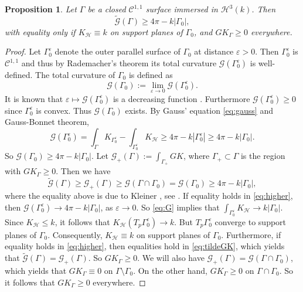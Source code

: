 \documentclass[11pt]{amsart}
\newtheorem{proposition}[theorem]{Proposition}
\theoremstyle{definition}
\newcommand{\C}{\mathcal{C}}
\renewcommand{\epsilon}{\varepsilon}
\renewcommand{\tilde}{\widetilde}
\begin{document}
\begin{proposition}\label{prop:high-g}
Let $\Gamma$ be a closed $\C^{1,1}$ surface immersed in $\mathcal{H}^3(k)$. Then
\begin{equation}\label{eq:higher}
\tilde{\mathcal{G}}(\Gamma)\geq 4\pi -k|\Gamma_0|,
\end{equation}
with equality only if $K_{\mathcal{H}}\equiv k$ on support planes of $\Gamma_0$, and $GK_\Gamma\geq 0$ everywhere.
\end{proposition}
\begin{proof}
Let $\Gamma_0^\epsilon$ denote the outer parallel surface of $\Gamma_0$ at distance $\epsilon>0$. Then $\Gamma_0^\epsilon$ is $\C^{1,1}$ \cite[Lem. 2.6]{ghomi-spruck2022} and thus by Rademacher's theorem its total curvature $\mathcal{G}(\Gamma_0^\epsilon)$ is well-defined. The total curvature of $\Gamma_0$ is defined as
$$
\mathcal{G}(\Gamma_0)
:=
\lim_{\epsilon\to 0}\mathcal{G}(\Gamma_0^\epsilon).
$$ 
It is known that $\epsilon\mapsto \mathcal{G}(\Gamma_0^\epsilon)$ is a decreasing function  \cite[Sec. 6]{ghomi-spruck2022}. 
Furthermore $\mathcal{G}(\Gamma_0^\epsilon)\geq 0$ since $\Gamma_0^\epsilon$ is convex.
Thus $\mathcal{G}(\Gamma_0)$ exists.
By Gauss' equation \eqref{eq:gauss} and Gauss-Bonnet theorem,
\begin{equation}\label{eq:G}
\mathcal{G}(\Gamma_0^\epsilon)=\int_\Gamma K_{\Gamma_0^\epsilon}-\int_{\Gamma_0^\epsilon}K_{\mathcal{H}}
\geq
4\pi -k|\Gamma_0^\epsilon|
\geq
4\pi -k|\Gamma_0|.
\end{equation}
So $\mathcal{G}(\Gamma_0)\geq 4\pi-k|\Gamma_0|$.
Let $\mathcal{G}_+(\Gamma):=\int_{\Gamma_+}GK$, where $\Gamma_+\subset\Gamma$ is the region with $GK_\Gamma\geq 0$. Then we have
\begin{equation}\label{eq:tildeGK}
\tilde{\mathcal{G}}(\Gamma)\geq\mathcal{G}_+(\Gamma)\geq\mathcal{G}(\Gamma\cap\Gamma_0)
=
\mathcal{G}(\Gamma_0)
\geq 
4\pi-k|\Gamma_0|,
\end{equation}
where the equality above is due to Kleiner \cite{kleiner1992}, see  \cite[Prop. 6.6]{ghomi-spruck2022}.  
If  equality holds in \eqref{eq:higher}, then $\mathcal{G}(\Gamma_0^\epsilon)\to 4\pi-k|\Gamma_0|$, as $\epsilon\to 0$. So \eqref{eq:G} implies that $\int_{\Gamma_0^\epsilon}K_{\mathcal{H}}\to k|\Gamma_0|$. Since $K_\mathcal{H}\leq k$, it follows that
$K_{\mathcal{H}}(T_p\Gamma_0^\epsilon)\to k$. But $T_p\Gamma_0^\epsilon$ converge to support planes of $\Gamma_0$. Consequently, $K_{\mathcal{H}}\equiv k$ on support planes of $\Gamma_0$. Furthermore, if equality holds in \eqref{eq:higher}, then equalities hold in \eqref{eq:tildeGK}, which yields that $\tilde{\mathcal{G}}(\Gamma)=\mathcal{G}_+(\Gamma)$. So $GK_\Gamma\geq 0$. We will also have
$\mathcal{G}_+(\Gamma)=\mathcal{G}(\Gamma\cap\Gamma_0)$, which yields that $GK_\Gamma\equiv 0$ on $\Gamma\setminus\Gamma_0$. On the other hand, $GK_\Gamma\geq 0$ on $\Gamma\cap\Gamma_0$. So it follows that $GK_\Gamma\geq 0$ everywhere. 
\end{proof}
\end{document}
